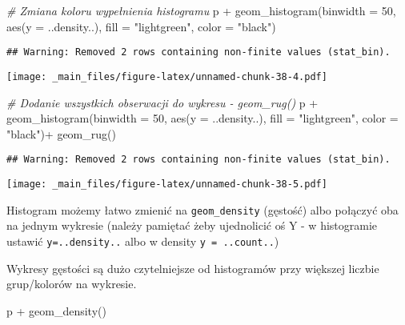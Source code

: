 \documentclass[
]{book}
\newenvironment{Shaded}{\begin{snugshade}}{\end{snugshade}}
\newcommand{\AttributeTok}[1]{\textcolor[rgb]{0.77,0.63,0.00}{#1}}
\newcommand{\CommentTok}[1]{\textcolor[rgb]{0.56,0.35,0.01}{\textit{#1}}}
\newcommand{\DecValTok}[1]{\textcolor[rgb]{0.00,0.00,0.81}{#1}}
\newcommand{\FunctionTok}[1]{\textcolor[rgb]{0.00,0.00,0.00}{#1}}
\newcommand{\NormalTok}[1]{#1}
\newcommand{\SpecialCharTok}[1]{\textcolor[rgb]{0.00,0.00,0.00}{#1}}
\newcommand{\StringTok}[1]{\textcolor[rgb]{0.31,0.60,0.02}{#1}}
\begin{document}
\begin{Shaded}
\begin{Highlighting}[]
\CommentTok{\# Zmiana koloru wypełnienia histogramu}
\NormalTok{p }\SpecialCharTok{+} \FunctionTok{geom\_histogram}\NormalTok{(}\AttributeTok{binwidth =} \DecValTok{50}\NormalTok{, }\FunctionTok{aes}\NormalTok{(}\AttributeTok{y =}\NormalTok{ ..density..), }
                   \AttributeTok{fill =} \StringTok{"lightgreen"}\NormalTok{, }\AttributeTok{color =} \StringTok{"black"}\NormalTok{)}
\end{Highlighting}
\end{Shaded}

\begin{verbatim}
## Warning: Removed 2 rows containing non-finite values (stat_bin).
\end{verbatim}

\texttt{[image: \_main\_files/figure-latex/unnamed-chunk-38-4.pdf]}

\begin{Shaded}
\begin{Highlighting}[]
\CommentTok{\# Dodanie wszystkich obserwacji do wykresu {-} geom\_rug()}
\NormalTok{p }\SpecialCharTok{+} \FunctionTok{geom\_histogram}\NormalTok{(}\AttributeTok{binwidth =} \DecValTok{50}\NormalTok{, }\FunctionTok{aes}\NormalTok{(}\AttributeTok{y =}\NormalTok{ ..density..), }
                   \AttributeTok{fill =} \StringTok{"lightgreen"}\NormalTok{, }\AttributeTok{color =} \StringTok{"black"}\NormalTok{)}\SpecialCharTok{+}
  \FunctionTok{geom\_rug}\NormalTok{()}
\end{Highlighting}
\end{Shaded}

\begin{verbatim}
## Warning: Removed 2 rows containing non-finite values (stat_bin).
\end{verbatim}

\texttt{[image: \_main\_files/figure-latex/unnamed-chunk-38-5.pdf]}

Histogram możemy łatwo zmienić na \texttt{geom\_density} (gęstość) albo połączyć oba na jednym wykresie (należy pamiętać żeby ujednolicić oś Y - w histogramie ustawić \texttt{y=..density..} albo w density \texttt{y\ =\ ..count..})

Wykresy gęstości są dużo czytelniejsze od histogramów przy większej liczbie grup/kolorów na wykresie.

\begin{Shaded}
\begin{Highlighting}[]
\NormalTok{p }\SpecialCharTok{+} \FunctionTok{geom\_density}\NormalTok{()}
\end{Highlighting}
\end{Shaded}
\end{document}

